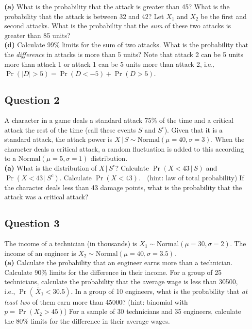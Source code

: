 \documentclass[]{article}
\begin{document}
{\bf(a)} What is the probability that the attack is greater than 45?  What is the probability that the attack is between 32 and 42?  Let $X_1$ and $X_2$ be the first and second attacks. What is the probability that the \emph{sum} of these two attacks is greater than 85 units? \quad \\{\bf(d)} Calculate 99\% limits for the sum of two attacks.   What is the probability that the \emph{difference} in attacks is more than 5 units? Note that attack 2 can be 5 units more than attack 1 or attack 1 can be 5 units more than attack 2, i.e., $\Pr(|D|>5)=\Pr(D<-5) + \Pr(D>5)$.



\subsection*{Question 2}

A character in a game deals a standard attack 75\% of the time and a critical attack the rest of the time (call these events $S$ and $S^c$). Given that it is a standard attack, the attack power is $X\,|\,S \sim \text{Normal}(\mu=40,\sigma=3)$. When the character deals a critical attack, a random fluctuation is added to this according to a $\text{Normal}(\mu=5,\sigma=1)$ distribution.\\[-0.2cm]

{\bf(a)} What is the distribution of $X\,|\,S^c$?  Calculate $\Pr(X<43\,|\,S)$ and $\Pr(X<43\,|\,S^c)$.  Calculate $\Pr(X<43)$. \,\, (hint: law of total probability)  If the character deals less than 43 damage points, what is the probability that the attack was a critical attack?



\subsection*{Question 3}
The income of a technician (in thousands) is $X_1 \sim \text{Normal}(\mu=30,\sigma=2)$. The income of an engineer is $X_2 \sim \text{Normal}(\mu=40,\sigma=3.5)$. \\[-0.2cm]

{\bf(a)} Calculate the probability that an engineer earns more than a technician.  Calculate 90\% limits for the difference in their income.  For a group of 25 technicians, calculate the probability that the average wage is less than 30500, i.e., $\Pr(\,\overline{\!X}_1 < 30.5)$.  In a group of 10 engineers, what is the probability that \emph{at least two} of them earn more than 45000? (hint: binomial with $p = \Pr(X_2 > 45)$)  For a sample of 30 technicians and 35 engineers, calculate the 80\% limits for the difference in their average wages.
\end{document}
